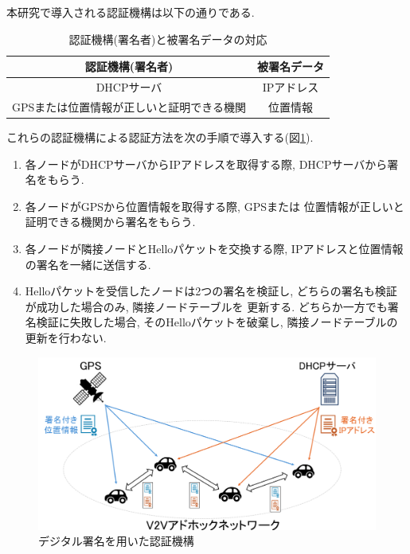 \indent 本研究で導入される認証機構は以下の通りである.
\setlength{\tabcolsep}{30pt}
\begin{longtable}{cc}
  \caption{認証機構(署名者)と被署名データの対応}
  \endfirsthead
  \hline
  \multicolumn{1}{c}{認証機構(署名者)} & \multicolumn{1}{c}{被署名データ} \\ \hline \hline
  DHCPサーバ & IPアドレス \\
  GPSまたは位置情報が正しいと証明できる機関 & 位置情報 \\ \hline
\end{longtable}
\vspace{2em}
\indent これらの認証機構による認証方法を次の手順で導入する(図\ref{fig:introduce}).
\begin{enumerate}
  \item 各ノードがDHCPサーバからIPアドレスを取得する際, 
  DHCPサーバから署名をもらう.
  \item 各ノードがGPSから位置情報を取得する際, GPSまたは
  位置情報が正しいと証明できる機関から署名をもらう.
  \item 各ノードが隣接ノードとHelloパケットを交換する際, 
  IPアドレスと位置情報の署名を一緒に送信する. 
  \item Helloパケットを受信したノードは2つの署名を検証し, 
  どちらの署名も検証が成功した場合のみ, 隣接ノードテーブルを
  更新する. どちらか一方でも署名検証に失敗した場合, 
  そのHelloパケットを破棄し, 隣接ノードテーブルの更新を行わない.
\end{enumerate}

\begin{figure}[h]
  \centering
  \includegraphics[scale=0.8]{figures/introduce.png}
  \caption{デジタル署名を用いた認証機構\cite{shinato}}
  \label{fig:introduce}
\end{figure}


